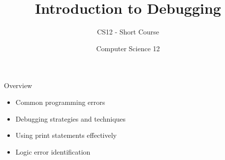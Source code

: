 \documentclass[10pt]{beamer}
\title{Introduction to Debugging}
\subtitle{CS12 - Short Course}
\author{Computer Science 12}
\date{}
\begin{document}
\begin{frame}
    \titlepage
\end{frame}

\begin{frame}{Overview}
    \begin{itemize}
        \item Common programming errors
        \item Debugging strategies and techniques
        \item Using print statements effectively
        \item Logic error identification
    \end{itemize}
\end{frame}

\end{document}
